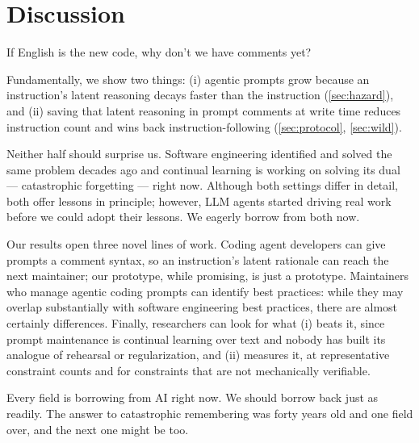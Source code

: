 \section{Discussion}
\label{sec:discussion}
If English is the new code, why don't we have comments yet?

Fundamentally, we show two things: (i) agentic prompts grow because an instruction's latent reasoning
decays faster than the instruction (\autoref{sec:hazard}), and (ii) saving that latent reasoning in prompt
comments at write time reduces instruction count and wins back instruction-following (\autoref{sec:protocol},
\autoref{sec:wild}).

Neither half should surprise us. Software engineering identified and solved the same problem decades ago and continual
learning is working on solving its dual --- catastrophic forgetting --- right now. Although both settings
differ in detail, both offer lessons in principle; however, LLM agents started driving real work before we
could adopt their lessons. We eagerly borrow from both now.

Our results open three novel lines of work. Coding agent developers can give prompts a comment syntax, so
an instruction's latent rationale can reach the next maintainer; our prototype, while promising, is just a
prototype. Maintainers who manage agentic coding prompts can identify best practices: while they may overlap
substantially with software engineering best practices, there are almost certainly differences. Finally,
researchers can look for what (i) beats it, since prompt maintenance is continual learning over text and
nobody has built its analogue of rehearsal or regularization, and (ii) measures it, at representative
constraint counts and for constraints that are not mechanically verifiable.

Every field is borrowing from AI right now. We should borrow back just as readily. The answer to
catastrophic remembering was forty years old and one field over, and the next one might be too.
